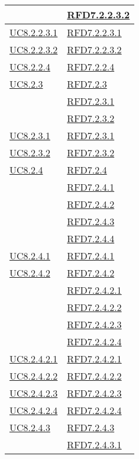 \begin{longtable}{|>{\centering}m{5cm}|m{5cm}<{\centering}|}
& \hyperlink{RFD7.2.2.3.2}{RFD7.2.2.3.2}\\ \hline
\hyperref[UC8.2.2.3.1]{UC8.2.2.3.1} & \hyperlink{RFD7.2.2.3.1}{RFD7.2.2.3.1}\\ \hline
\hyperref[UC8.2.2.3.2]{UC8.2.2.3.2} & \hyperlink{RFD7.2.2.3.2}{RFD7.2.2.3.2}\\ \hline
\hyperref[UC8.2.2.4]{UC8.2.2.4} & \hyperlink{RFD7.2.2.4}{RFD7.2.2.4}\\ \hline
\hyperref[UC8.2.3]{UC8.2.3} & \hyperlink{RFD7.2.3}{RFD7.2.3}\\
& \hyperlink{RFD7.2.3.1}{RFD7.2.3.1}\\
& \hyperlink{RFD7.2.3.2}{RFD7.2.3.2}\\ \hline
\hyperref[UC8.2.3.1]{UC8.2.3.1} & \hyperlink{RFD7.2.3.1}{RFD7.2.3.1}\\ \hline
\hyperref[UC8.2.3.2]{UC8.2.3.2} & \hyperlink{RFD7.2.3.2}{RFD7.2.3.2}\\ \hline
\hyperref[UC8.2.4]{UC8.2.4} & \hyperlink{RFD7.2.4}{RFD7.2.4}\\
& \hyperlink{RFD7.2.4.1}{RFD7.2.4.1}\\
& \hyperlink{RFD7.2.4.2}{RFD7.2.4.2}\\
& \hyperlink{RFD7.2.4.3}{RFD7.2.4.3}\\
& \hyperlink{RFD7.2.4.4}{RFD7.2.4.4}\\ \hline
\hyperref[UC8.2.4.1]{UC8.2.4.1} & \hyperlink{RFD7.2.4.1}{RFD7.2.4.1}\\ \hline
\hyperref[UC8.2.4.2]{UC8.2.4.2} & \hyperlink{RFD7.2.4.2}{RFD7.2.4.2}\\
& \hyperlink{RFD7.2.4.2.1}{RFD7.2.4.2.1}\\
& \hyperlink{RFD7.2.4.2.2}{RFD7.2.4.2.2}\\
& \hyperlink{RFD7.2.4.2.3}{RFD7.2.4.2.3}\\
& \hyperlink{RFD7.2.4.2.4}{RFD7.2.4.2.4}\\ \hline
\hyperref[UC8.2.4.2.1]{UC8.2.4.2.1} & \hyperlink{RFD7.2.4.2.1}{RFD7.2.4.2.1}\\ \hline
\hyperref[UC8.2.4.2.2]{UC8.2.4.2.2} & \hyperlink{RFD7.2.4.2.2}{RFD7.2.4.2.2}\\ \hline
\hyperref[UC8.2.4.2.3]{UC8.2.4.2.3} & \hyperlink{RFD7.2.4.2.3}{RFD7.2.4.2.3}\\ \hline
\hyperref[UC8.2.4.2.4]{UC8.2.4.2.4} & \hyperlink{RFD7.2.4.2.4}{RFD7.2.4.2.4}\\ \hline
\hyperref[UC8.2.4.3]{UC8.2.4.3} & \hyperlink{RFD7.2.4.3}{RFD7.2.4.3}\\
& \hyperlink{RFD7.2.4.3.1}{RFD7.2.4.3.1}\\ \hline

\end{longtable}
